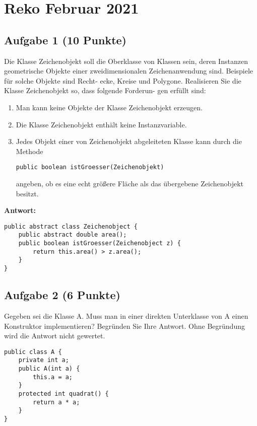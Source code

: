 \chapter{Reko Februar 2021}

\section{Aufgabe 1 (10 Punkte)}

Die Klasse Zeichenobjekt soll die Oberklasse von Klassen sein, deren Instanzen
geometrische Objekte einer zweidimensionalen Zeichenanwendung sind. Beispiele
für solche Objekte sind Recht- ecke, Kreise und Polygone. Realisieren Sie die
Klasse Zeichenobjekt so, dass folgende Forderun- gen erfüllt sind:

\begin{enumerate}
    \item Man kann keine Objekte der Klasse Zeichenobjekt erzeugen.
    \item Die Klasse Zeichenobjekt enthält keine Instanzvariable.
    \item Jedes Objekt einer von Zeichenobjekt abgeleiteten Klasse kann durch die Methode
          \begin{lstlisting}
public boolean istGroesser(Zeichenobjekt)
\end{lstlisting}
          angeben, ob es eine echt größere Fläche als das übergebene Zeichenobjekt
          besitzt.
\end{enumerate}

\textbf{Antwort:}

\begin{lstlisting}
public abstract class Zeichenobject {
    public abstract double area();
    public boolean istGroesser(Zeichenobject z) {
        return this.area() > z.area();
    }
}
\end{lstlisting}

\section{Aufgabe 2 (6 Punkte)}

Gegeben sei die Klasse A. Muss man in einer direkten Unterklasse von A einen
Konstruktor implementieren? Begründen Sie Ihre Antwort. Ohne Begründung wird
die Antwort nicht gewertet.

\begin{lstlisting}
public class A {
    private int a;
    public A(int a) {
        this.a = a;
    }
    protected int quadrat() {
        return a * a;
    }
}
\end{lstlisting}


